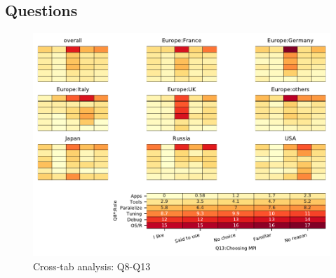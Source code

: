 
\subsection{Questions}


\begin{figure}
\begin{center}
\includegraphics[width=12cm]{../pdfs/Q8-Q13.pdf}
\caption{Cross-tab analysis: Q8-Q13}
\label{fig:Q8-Q13}
\end{center}
\end{figure}
